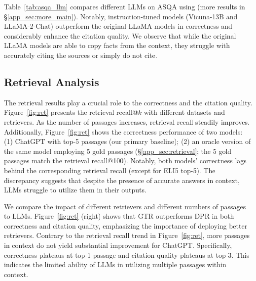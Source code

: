 Table~\ref{tab:asqa_llm} compares 
different LLMs on ASQA using \vani{} (more results  in \S\ref{app_sec:more_main}).
Notably, instruction-tuned models (Vicuna-13B and LLaMA-2-Chat)
outperform the original LLaMA models in correctness and 
considerably enhance the citation quality.
We observe that 
while the original LLaMA models are able to %
copy facts from the context,
they struggle with accurately citing the sources or simply do not cite. 





\subsection{Retrieval Analysis}



The retrieval results play a crucial role to the correctness and the citation quality.
Figure~\ref{fig:ret} presents 
the retrieval recall@$k$ %
with different datasets and retrievers.
As the number of passages increases, retrieval recall steadily improves.
Additionally, Figure~\ref{fig:ret} shows
the correctness performance of two models:
(1) ChatGPT \vani{} with top-5 passages (our primary baseline);
(2) an oracle version of the same model employing
5 gold passages (\S\ref{app_sec:retrieval}; the 5 gold passages match the retrieval recall@100).
Notably,
both models' correctness lags behind the corresponding retrieval recall (except for ELI5 top-5).
The discrepancy suggests that 
despite the presence of accurate answers in context,
LLMs struggle to utilize  them in their outputs.



We compare the impact of different retrievers and different numbers of passages to LLMs.
Figure~\ref{fig:ret} (right)
shows that
GTR outperforms DPR in both correctness and citation quality,
emphasizing  the importance of deploying better retrievers.
Contrary to the  retrieval recall trend  in Figure~\ref{fig:ret},
more passages in context do not yield substantial improvement for ChatGPT.
Specifically, correctness plateaus at top-1 passage and citation quality plateaus at top-3. 
This  indicates the limited ability of LLMs in  utilizing multiple passages within context.

